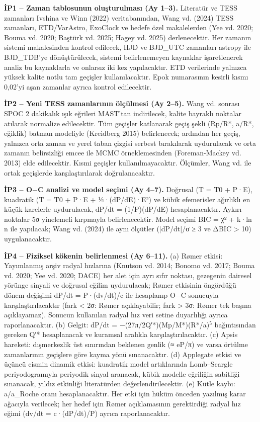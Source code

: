 \textbf{İP1 – Zaman tablosunun oluşturulması (Ay 1–3).} Literatür ve TESS zamanları Ivshina ve Winn (2022) veritabanından, Wang vd. (2024) TESS zamanları, ETD/VarAstro, ExoClock ve hedefe özel makalelerden (Yee vd. 2020; Bouma vd. 2020; Baştürk vd. 2025; Hagey vd. 2025) derlenecektir. Her zamanın sistemi makalesinden kontrol edilecek, HJD ve BJD\_UTC zamanları astropy ile BJD\_TDB'ye dönüştürülecek, sistemi belirlenemeyen kaynaklar işaretlenerek analiz bu kaynaklarla ve onlarsız iki kez yapılacaktır. ETD verilerinde yalnızca yüksek kalite notlu tam geçişler kullanılacaktır. Epok numarasının kesirli kısmı 0,02'yi aşan zamanlar ayrıca kontrol edilecektir.

\textbf{İP2 – Yeni TESS zamanlarının ölçülmesi (Ay 2–5).} Wang vd. sonrası SPOC 2 dakikalık ışık eğrileri MAST'tan indirilecek, kalite bayraklı noktalar atılarak normalize edilecektir. Tüm geçişler katlanarak geçiş şekli (Rp/R*, a/R*, eğiklik) batman modeliyle (Kreidberg 2015) belirlenecek; ardından her geçiş, yalnızca orta zaman ve yerel taban çizgisi serbest bırakılarak uydurulacak ve orta zamanın belirsizliği emcee ile MCMC örneklemesinden (Foreman-Mackey vd. 2013) elde edilecektir. Kısmi geçişler kullanılmayacaktır. Ölçümler, Wang vd. ile ortak geçişlerde karşılaştırılarak doğrulanacaktır.

\textbf{İP3 – O$-$C analizi ve model seçimi (Ay 4–7).} Doğrusal (T = T0 + P·E), kuadratik (T = T0 + P·E + ½·(dP/dE)·E²) ve kübik efemerisler ağırlıklı en küçük karelerle uydurulacak, dP/dt = (1/P)(dP/dE) hesaplanacaktır. Aykırı noktalar 5σ yinelemeli kırpmayla belirlenecektir. Model seçimi BIC = χ² + k·ln n ile yapılacak; Wang vd. (2024) ile aynı ölçütler (|dP/dt|/σ ≥ 3 ve ΔBIC > 10) uygulanacaktır.

\textbf{İP4 – Fiziksel kökenin belirlenmesi (Ay 6–11).} (a) Rømer etkisi: Yayımlanmış arşiv radyal hızlarına (Knutson vd. 2014; Bonomo vd. 2017; Bouma vd. 2020; Yee vd. 2020; DACE) her alet için ayrı sıfır noktası, gezegenin dairesel yörünge sinyali ve doğrusal eğilim uydurulacak; Rømer etkisinin öngördüğü dönem değişimi dP/dt = P·(dv/dt)/c ile hesaplanıp O$-$C sonucuyla karşılaştırılacaktır (fark < 2σ: Rømer açıklayabilir; fark > 3σ: Rømer tek başına açıklayamaz). Sonucun kullanılan radyal hız veri setine duyarlılığı ayrıca raporlanacaktır. (b) Gelgit: dP/dt = −(27π/2Q′*)(Mp/M*)(R*/a)$^5$ bağıntısından gereken Q′* hesaplanacak ve kuramsal aralıkla karşılaştırılacaktır. (c) Apsis hareketi: dışmerkezlik üst sınırından beklenen genlik (≈ eP/π) ve varsa örtülme zamanlarının geçişlere göre kayma yönü sınanacaktır. (d) Applegate etkisi ve üçüncü cismin dinamik etkisi: kuadratik model artıklarında Lomb–Scargle periyodogramıyla periyodik sinyal aranacak, kübik modelle eğriliğin sabitliği sınanacak, yıldız etkinliği literatürden değerlendirilecektir. (e) Kütle kaybı: a/a\_Roche oranı hesaplanacaktır. Her etki için hüküm önceden yazılmış karar ağacıyla verilecek; her hedef için Rømer açıklamasının gerektirdiği radyal hız eğimi (dv/dt = c·(dP/dt)/P) ayrıca raporlanacaktır.

